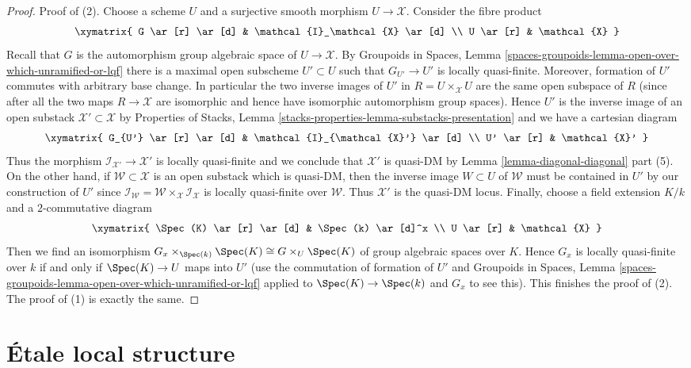 \begin{proof}
Proof of (2). Choose a scheme $U$ and a surjective smooth morphism
$U \to \mathcal{X}$. Consider the fibre product
$$
\xymatrix{
G \ar[r] \ar[d] & \mathcal{I}_\mathcal{X} \ar[d] \\
U \ar[r] & \mathcal{X}
}
$$
Recall that $G$ is the automorphism group algebraic space of
$U \to \mathcal{X}$. By Groupoids in Spaces, Lemma
\ref{spaces-groupoids-lemma-open-over-which-unramified-or-lqf}
there is a maximal open subscheme $U' \subset U$
such that $G_{U'} \to U'$ is locally quasi-finite.
Moreover, formation of $U'$ commutes with arbitrary
base change. In particular the two inverse images of $U'$
in $R = U \times_\mathcal{X} U$ are the same open subspace of $R$
(since after all the two maps $R \to \mathcal{X}$ are isomorphic
and hence have isomorphic automorphism group spaces).
Hence $U'$ is the inverse image of an open substack
$\mathcal{X}' \subset \mathcal{X}$ by
Properties of Stacks, Lemma
\ref{stacks-properties-lemma-substacks-presentation}
and we have a cartesian diagram
$$
\xymatrix{
G_{U'} \ar[r] \ar[d] & \mathcal{I}_{\mathcal{X}'} \ar[d] \\
U' \ar[r] & \mathcal{X}'
}
$$
Thus the morphism $\mathcal{I}_{\mathcal{X}'} \to \mathcal{X}'$
is locally quasi-finite and we conclude that
$\mathcal{X}'$ is quasi-DM by Lemma \ref{lemma-diagonal-diagonal}
part (5). On the other hand, if $\mathcal{W} \subset \mathcal{X}$
is an open substack which is quasi-DM, then the inverse image
$W \subset U$ of $\mathcal{W}$ must be contained in $U'$ by our
construction of $U'$ since
$\mathcal{I}_\mathcal{W} =
\mathcal{W} \times_\mathcal{X} \mathcal{I}_\mathcal{X}$
is locally quasi-finite over $\mathcal{W}$.
Thus $\mathcal{X}'$ is the quasi-DM locus.
Finally, choose a field extension $K/k$ and a $2$-commutative
diagram
$$
\xymatrix{
\Spec(K) \ar[r] \ar[d] & \Spec(k) \ar[d]^x \\
U \ar[r] & \mathcal{X}
}
$$
Then we find an isomorphism
$G_x \times_{\Spec(k)} \Spec(K) \cong G \times_U \Spec(K)$
of group algebraic spaces over $K$. Hence $G_x$ is locally quasi-finite
over $k$ if and only if $\Spec(K) \to U$ maps into $U'$
(use the commutation of formation of $U'$ and
Groupoids in Spaces, Lemma
\ref{spaces-groupoids-lemma-open-over-which-unramified-or-lqf}
applied to $\Spec(K) \to \Spec(k)$ and $G_x$ to see this).
This finishes the proof of (2). The proof of (1) is
exactly the same.
\end{proof}



\section{\'Etale local structure}
\label{section-etale-local}


